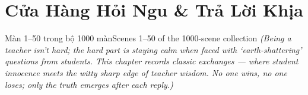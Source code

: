 \chapter{Cửa Hàng Hỏi Ngu \& Trả Lời Khịa}

\begin{truyen}{Màn 1–50 trong bộ 1000 màn}{Scenes 1–50 of the 1000-scene collection}
\textit{(Being a teacher isn't hard; the hard part is staying calm when faced with `earth-shattering' questions from students. This chapter records classic exchanges --- where student innocence meets the witty sharp edge of teacher wisdom. No one wins, no one loses; only the truth emerges after each reply.)}
\end{truyen}

